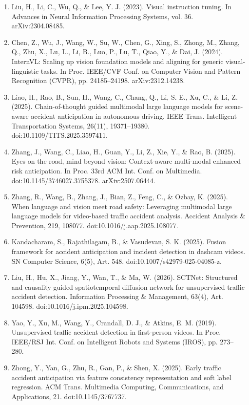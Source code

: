 \begin{enumerate}
\item
  Liu, H., Li, C., Wu, Q., \& Lee, Y. J. (2023). Visual instruction tuning. In Advances in Neural Information Processing Systems, vol. 36. arXiv:2304.08485.
\item
  Chen, Z., Wu, J., Wang, W., Su, W., Chen, G., Xing, S., Zhong, M., Zhang, Q., Zhu, X., Lu, L., Li, B., Luo, P., Lu, T., Qiao, Y., \& Dai, J. (2024). InternVL: Scaling up vision foundation models and aligning for generic visual-linguistic tasks. In Proc. IEEE/CVF Conf. on Computer Vision and Pattern Recognition (CVPR), pp. 24185--24198. arXiv:2312.14238.
\item
  Liao, H., Rao, B., Sun, H., Wang, C., Chang, Q., Li, S. E., Xu, C., \& Li, Z. (2025). Chain-of-thought guided multimodal large language models for scene-aware accident anticipation in autonomous driving. IEEE Trans. Intelligent Transportation Systems, 26(11), 19371--19380. doi:10.1109/TITS.2025.3597411.
\item
  Zhang, J., Wang, C., Liao, H., Guan, Y., Li, Z., Xie, Y., \& Rao, B. (2025). Eyes on the road, mind beyond vision: Context-aware multi-modal enhanced risk anticipation. In Proc. 33rd ACM Int. Conf. on Multimedia. doi:10.1145/3746027.3755378. arXiv:2507.06444.
\item
  Zhang, R., Wang, B., Zhang, J., Bian, Z., Feng, C., \& Ozbay, K. (2025). When language and vision meet road safety: Leveraging multimodal large language models for video-based traffic accident analysis. Accident Analysis \& Prevention, 219, 108077. doi:10.1016/j.aap.2025.108077.
\item
  Kandacharam, S., Rajathilagam, B., \& Vasudevan, S. K. (2025). Fusion framework for accident anticipation and incident detection in dashcam videos. SN Computer Science, 6(5), Art. 548. doi:10.1007/s42979-025-04085-z.
\item
  Liu, H., Hu, X., Jiang, Y., Wan, T., \& Ma, W. (2026). SCTNet: Structured and causality-guided spatiotemporal diffusion network for unsupervised traffic accident detection. Information Processing \& Management, 63(4), Art. 104598. doi:10.1016/j.ipm.2025.104598.
\item
  Yao, Y., Xu, M., Wang, Y., Crandall, D. J., \& Atkins, E. M. (2019). Unsupervised traffic accident detection in first-person videos. In Proc. IEEE/RSJ Int. Conf. on Intelligent Robots and Systems (IROS), pp. 273--280.
\item
  Zhong, Y., Yan, G., Zhu, R., Gan, P., \& Shen, X. (2025). Early traffic accident anticipation via feature consistency representation and soft label regression. ACM Trans. Multimedia Computing, Communications, and Applications, 21. doi:10.1145/3767737.

\end{enumerate}
